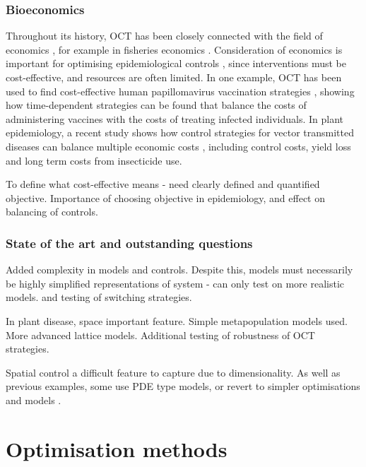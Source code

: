 \subsubsection{Bioeconomics}

Throughout its history, OCT has been closely connected with the field of economics \citep{weber_optimal_2011}, for example in fisheries economics \citep{clark_economics_1975}. Consideration of economics is important for optimising epidemiological controls \citep{perrings_merging_2014}, since interventions must be cost-effective, and resources are often limited. In one example, OCT has been used to find cost-effective human papillomavirus vaccination strategies \citep{brown_role_2011}, showing how time-dependent strategies can be found that balance the costs of administering vaccines with the costs of treating infected individuals. In plant epidemiology, a recent study shows how control strategies for vector transmitted diseases can balance multiple economic costs \citep{bokil_optimal_2019}, including control costs, yield loss and long term costs from insecticide use.

To define what cost-effective means - need clearly defined and quantified objective. Importance of choosing objective in epidemiology, and effect on balancing of controls.

\subsubsection{State of the art and outstanding questions}

Added complexity in models and controls. Despite this, models must necessarily be highly simplified representations of system - can only test on more realistic models. \citet{rowthorn_optimal_2009} and testing of switching strategies.

In plant disease, space important feature. Simple metapopulation models used. More advanced lattice models. Additional testing of robustness of OCT strategies.

Spatial control a difficult feature to capture due to dimensionality. As well as previous examples, some use PDE type models, or revert to simpler optimisations and models \citep{epanchin_optimal_2012}.

\section{Optimisation methods}\label{sec:ch2:optim_methods}

